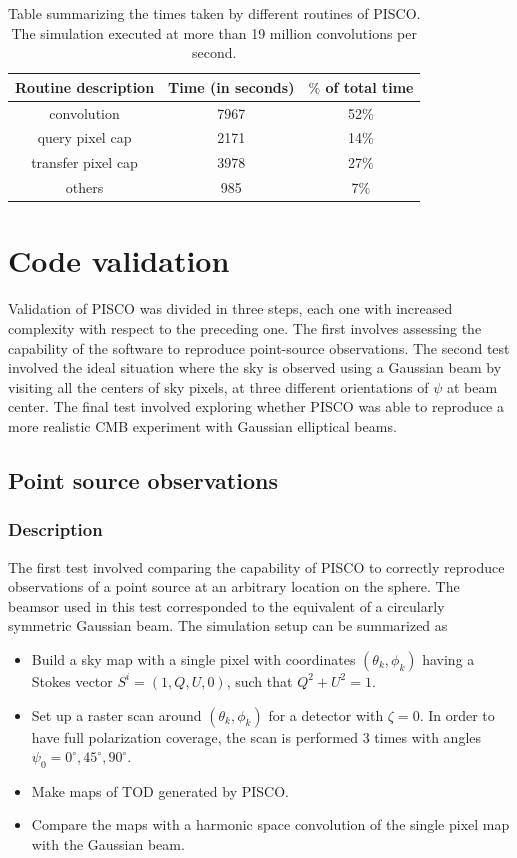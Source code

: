 \documentclass[a4paper,11pt]{article}
\begin{document}
\begin{table}[tbp]
	\centering
	\begin{tabular}{|c|c|c|}
		\hline
		Routine description & Time (in seconds) & $\%$ of total time \\
		\hline
		convolution & 7967 & 52$\%$  \\
		query pixel cap & 2171 & 14$\%$ \\
		transfer pixel cap & 3978 & 27$\%$ \\
		others & 985 & 7$\%$ \\ 
		\hline
	\end{tabular}
	\caption{Table summarizing the times taken by different routines of PISCO. The simulation executed at more than 19 million convolutions per second.}\label{tbl1}
\end{table}

%
\section{Code validation}
\label{sec::validation}

Validation of PISCO was divided in three steps, each one with increased complexity with respect to the preceding one. The first involves assessing the capability of the software to reproduce point-source observations. The second test involved the ideal situation where the sky is observed using a Gaussian beam by visiting all the centers of sky pixels, at three different orientations of $\psi$ at beam center. The final test involved exploring whether PISCO was able to reproduce a more realistic CMB experiment with Gaussian elliptical beams.

\subsection{Point source observations}

\subsubsection{Description}

The first test involved comparing the capability of PISCO to correctly reproduce observations of a point source at an arbitrary location on the sphere. The beamsor used in this test corresponded to the equivalent of a circularly symmetric Gaussian beam. The simulation setup can be summarized as

\begin{itemize}
	\item Build a sky map with a single pixel with coordinates $(\theta_k,\phi_k)$ having a Stokes vector $S^{i} = (1,Q,U,0)$, such that $Q^2 + U^2 = 1$.
	\item Set up a raster scan around $(\theta_k,\phi_k)$ for a detector with $\zeta=0$. In order to have full polarization coverage, the scan is performed 3 times with angles $\psi_0 = 0^{\circ},45^{\circ},90^{\circ}$.
	\item Make maps of TOD generated by PISCO.
	\item Compare the maps with a harmonic space convolution of the single pixel map with the Gaussian beam.
\end{itemize}
\end{document}
